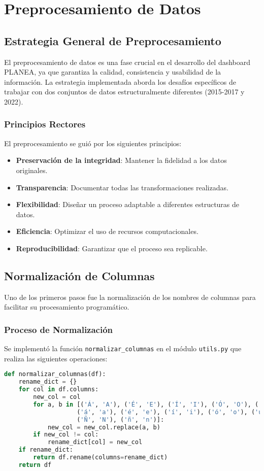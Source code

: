 \chapter{Preprocesamiento de Datos}

\section{Estrategia General de Preprocesamiento}
El preprocesamiento de datos es una fase crucial en el desarrollo del dashboard PLANEA, ya que garantiza la calidad, consistencia y usabilidad de la información. La estrategia implementada aborda los desafíos específicos de trabajar con dos conjuntos de datos estructuralmente diferentes (2015-2017 y 2022).

\subsection{Principios Rectores}
El preprocesamiento se guió por los siguientes principios:

\begin{itemize}
    \item \textbf{Preservación de la integridad}: Mantener la fidelidad a los datos originales.
    \item \textbf{Transparencia}: Documentar todas las transformaciones realizadas.
    \item \textbf{Flexibilidad}: Diseñar un proceso adaptable a diferentes estructuras de datos.
    \item \textbf{Eficiencia}: Optimizar el uso de recursos computacionales.
    \item \textbf{Reproducibilidad}: Garantizar que el proceso sea replicable.
\end{itemize}

\section{Normalización de Columnas}
Uno de los primeros pasos fue la normalización de los nombres de columnas para facilitar su procesamiento programático.

\subsection{Proceso de Normalización}
Se implementó la función \texttt{normalizar\_columnas} en el módulo \texttt{utils.py} que realiza las siguientes operaciones:

\begin{lstlisting}[language=Python, caption=Función de normalización de columnas]
def normalizar_columnas(df):
    rename_dict = {}
    for col in df.columns:
        new_col = col
        for a, b in [('Á', 'A'), ('É', 'E'), ('Í', 'I'), ('Ó', 'O'), ('Ú', 'U'),
                    ('á', 'a'), ('é', 'e'), ('í', 'i'), ('ó', 'o'), ('ú', 'u'),
                    ('Ñ', 'N'), ('ñ', 'n')]:
            new_col = new_col.replace(a, b)
        if new_col != col:
            rename_dict[col] = new_col
    if rename_dict:
        return df.rename(columns=rename_dict)
    return df
\end{lstlisting}


